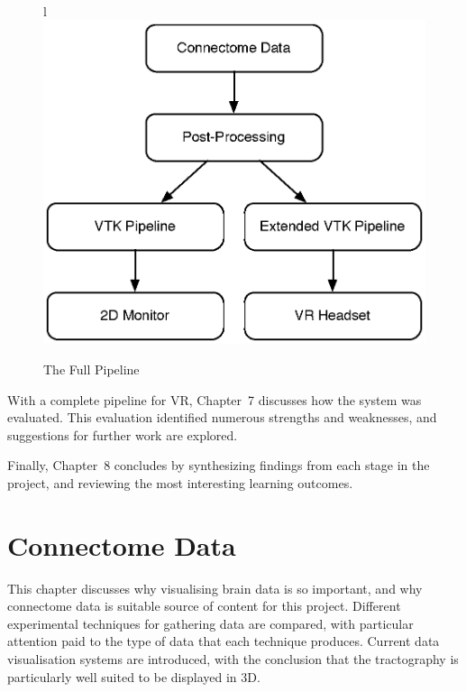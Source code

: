 \documentclass[MSc,paper=a4,pagesize=auto]{icldt}
\begin{document}
\begin{figure}[htbp!]l
    \centering
    \includegraphics[scale=0.5]{resources/data_pipeline_overview}
    \caption{The Full Pipeline}
    \label{fig:the_full_pipeline}
\end{figure}

With a complete pipeline for VR, Chapter~7 discusses how the system was evaluated. This evaluation identified numerous strengths and weaknesses, and suggestions for further work are explored.

Finally, Chapter~8 concludes by synthesizing findings from each stage in the project, and reviewing the most interesting learning outcomes.

\chapter{Connectome Data}

This chapter discusses why visualising brain data is so important, and why connectome data is suitable source of content for this project. Different experimental techniques for gathering data are compared, with particular attention paid to the type of data that each technique produces. Current data visualisation systems are introduced, with the conclusion that the tractography is particularly well suited to be displayed in 3D. 
\end{document}
